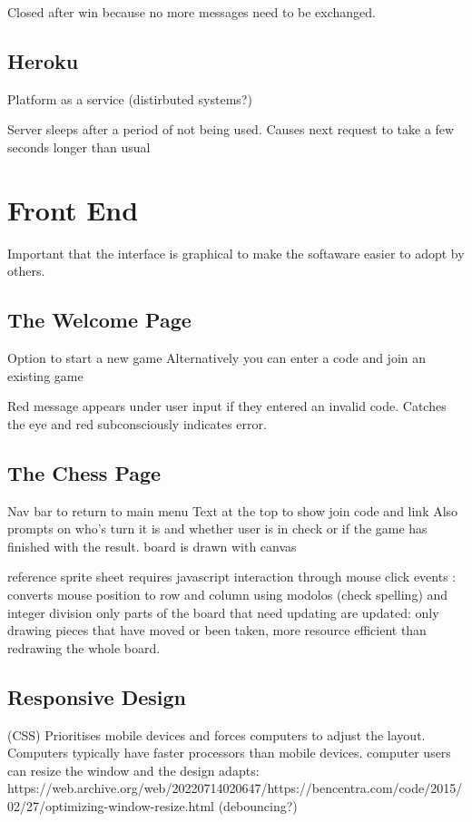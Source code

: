 Closed after win because no more messages need to be exchanged.

\subsection{Heroku}

Platform as a service (distirbuted systems?)

Server sleeps after a period of not being used. Causes next request to take a few seconds longer than usual


\section{Front End}

Important that the interface is graphical to make the softaware easier to adopt by others.

\subsection{The Welcome Page}

Option to start a new game\linebreak
Alternatively you can enter a code and join an existing game

Red message appears under user input if they entered an invalid code. Catches the eye and red subconsciously indicates error.

\subsection{The Chess Page}

Nav bar to return to main menu\linebreak
Text at the top to show join code and link\linebreak
Also prompts on who's turn it is and whether user is in check or if the game has finished with the result.\linebreak
board is drawn with canvas

reference sprite sheet\linebreak
requires javascript\linebreak
interaction through mouse click events : converts mouse position to row and column using modolos (check spelling) and integer division\linebreak
only parts of the board that need updating are updated: only drawing pieces that have moved or been taken, more resource efficient than redrawing the whole board.

\subsection{Responsive Design}

(CSS) Prioritises mobile devices and forces computers to adjust the layout. Computers typically have faster processors than mobile devices.\linebreak
computer users can resize the window and the design adapts: https://web.archive.org/web/20220714020647/https://bencentra.com/code/2015/02/27/optimizing-window-resize.html (debouncing?)